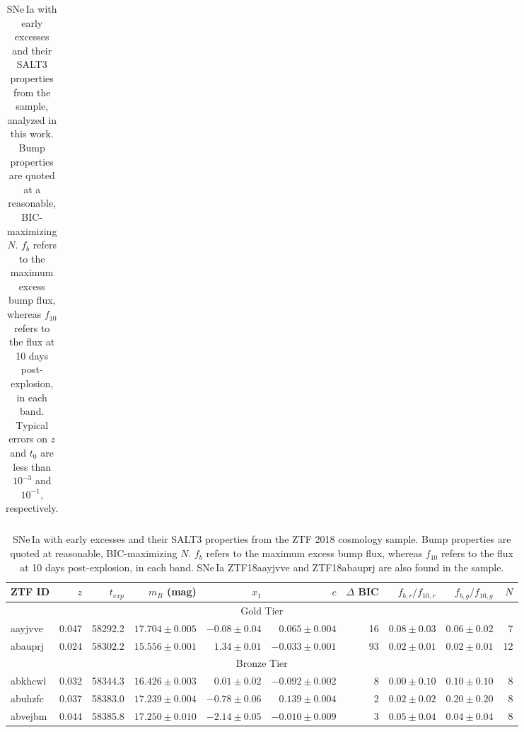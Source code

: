 \documentclass[twocolumn,twocolappendix, linenumbers]{aastex631} %
\begin{document}
\begin{table}[t]
\begin{tabular}{ |l|r|r|r|r|r|r|r|r|r| }
 \hline
\end{tabular}
\caption{SNe\,Ia with early excesses and their SALT3 properties from the \citet{Yao19} sample, analyzed in this work. Bump properties are quoted at a reasonable, BIC-maximizing $N$. $f_b$ refers to the maximum excess bump flux, whereas $f_{10}$ refers to the flux at 10 days post-explosion, in each band. Typical errors on $z$ and $t_0$ are less than $10^{-3}$ and $10^{-1}$, respectively.}
\label{table:yaoexcess}
\end{table}

\begin{table}[t]
\centering
\begin{tabular}{ |l|r|r|r|r|r|r|r|r|r| } 
  \hline
 
 ZTF ID & $z$ & $t_{exp}$ & $m_B$ (mag) & $x_1$ & $c$ & $\Delta$ BIC & $f_{b, r}/f_{10, r}$ & $f_{b, g}/f_{10, g}$ &  $N$\\ 
 \hline
 \multicolumn{10}{|c|}{Gold Tier} \\
 \hline
aayjvve & 0.047 & 58292.2 & $17.704 \pm 0.005$ & $-0.08 \pm 0.04$ & $0.065 \pm 0.004$ & 16 & $0.08 \pm 0.03$ & $0.06 \pm 0.02$ & 7 \\
abauprj & 0.024 & 58302.2 & $15.556 \pm 0.001$ & $1.34 \pm 0.01$ & $-0.033 \pm 0.001$ & 93 & $0.02 \pm 0.01$ & $0.02 \pm 0.01$ & 12 \\
 \hline
 \multicolumn{10}{|c|}{Bronze Tier} \\
 \hline
abkhcwl & 0.032 & 58344.3 & $16.426 \pm 0.003$ & $0.01 \pm 0.02$ & $-0.092 \pm 0.002$ & 8 & $0.00 \pm 0.10$ & $0.10 \pm 0.10$ & 8 \\
abuhzfc & 0.037 & 58383.0 & $17.239 \pm 0.004$ & $-0.78 \pm 0.06$ & $0.139 \pm 0.004$ & 2 & $0.02 \pm 0.02$ & $0.20 \pm 0.20$ & 8 \\
abvejbm & 0.044 & 58385.8 & $17.250 \pm 0.010$ & $-2.14 \pm 0.05$ & $-0.010 \pm 0.009$ & 3 & $0.05 \pm 0.04$ & $0.04 \pm 0.04$ & 8 \\
 \hline
 
 
 \hline
\end{tabular}
\caption{SNe\,Ia with early excesses and their SALT3 properties from the ZTF 2018 cosmology sample. Bump properties are quoted at reasonable, BIC-maximizing $N$. $f_b$ refers to the maximum excess bump flux, whereas $f_{10}$ refers to the flux at 10 days post-explosion, in each band.  SNe\,Ia ZTF18aayjvve and ZTF18abauprj are also found in the \citet{Yao19} sample.}
\label{table:dhawanexcess}
\end{table}
\end{document}
